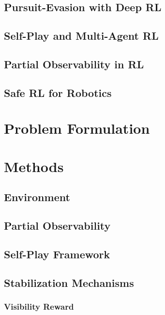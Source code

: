 \documentclass[letterpaper, 10 pt, conference]{ieeeconf}
\begin{document}
\subsection{Pursuit-Evasion with Deep RL}

\subsection{Self-Play and Multi-Agent RL}

\subsection{Partial Observability in RL}

\subsection{Safe RL for Robotics}

\section{Problem Formulation}
\label{sec:problem}

\section{Methods}
\label{sec:methods}

\subsection{Environment}

\subsection{Partial Observability}

\subsection{Self-Play Framework}

\subsection{Stabilization Mechanisms}

\subsubsection{Visibility Reward}
\end{document}
